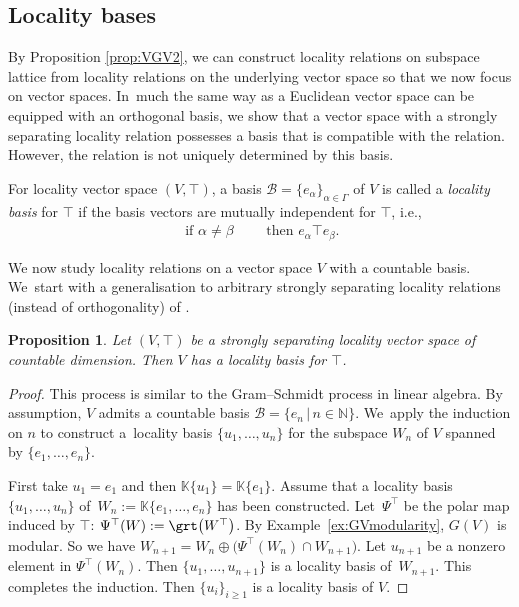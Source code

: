 \documentclass[pdftex]{sigma}
\numberwithin{equation}{section}
\newtheorem{Proposition}[Theorem]{Proposition}
\newcommand{\K}{\mathbb{K}}
\newcommand{\N}{\mathbb{N}}
\newcommand{\loc}{locality\xspace}
\newcommand{\pone}{separating\xspace }
\begin{document}
\subsection{Locality bases}
By Proposition \ref{prop:VGV2}, we can construct locality relations on subspace lattice from locality relations on the underlying vector space so that we now focus on vector spaces. In~much the same way as a Euclidean vector space can be equipped with an orthogonal basis, we show that a vector space with a strongly
\pone \loc relation possesses a basis that is compatible with the relation. However, the relation is not uniquely determined by this basis.

\begin{Definition} \label{defn:compl_map_TVS}
For locality vector space $(V, \top)$, a basis ${\mathcal B}=\{e_\alpha \}_{\alpha \in \Gamma} $ of $V$ is called a {\it \loc basis} for $\top$ if the basis vectors are mutually independent for $\top$, i.e.,
\begin{gather*}%
\text{ if } \alpha \neq \beta \qquad \text{ then } e_\alpha \top e_\beta.
\end{gather*}
\end{Definition}

We now study \loc relations on a vector space $V$ with a countable basis. We~start with a generalisation to arbitrary strongly separating locality relations (instead of orthogonality) of \cite[Chapter II, Theorem 1]{Gross79}.
\begin{Proposition}\label{prop:Psisplitting}	
Let $(V, \top) $ be a strongly \pone \loc vector space of countable dimension.
Then $V$ has a \loc basis for $\top$.
\end{Proposition}

\begin{proof} This process is similar to the Gram--Schmidt process in linear algebra. By assumption, $V$ admits a countable basis ${\mathcal B}=\{e_n\,|\, n\in \N\}$. We~apply the induction on $n$ to construct a~locality basis $\{u_1,\dots,u_n\}$ for the subspace $W_n$ of $V$ spanned by $\{e_1,\dots,e_n\}$.

First take $u_1=e_1$ and then $\K\{u_1\}=\K\{e_1\}$. Assume that a \loc basis $\{u_1,\dots,u_n\}$ of~$W_n:=\K\{e_1,\dots, e_n\}$ has been constructed.
Let~$\Psi^\top$ be the polar map
induced by $\top$: $\Psi^\top(W):=\grt\big(W^\top\big)$.
By Example~\ref{ex:GVmodularity}, $G(V)$ is modular. So we have
$W_{n+1}=W_n\oplus \big(\Psi^\top(W_n)\cap W_{n+1}\big)$. Let $u_{n+1}$ be a nonzero element in $\Psi^\top(W_n)$. Then $\{u_1,\dots,u_{n+1}\}$ is a locality basis of~$W_{n+1}$. This completes the induction. Then $\{u_i\}_{i\geq 1}$ is a \loc basis of $V$.
\end{proof}
\end{document}
